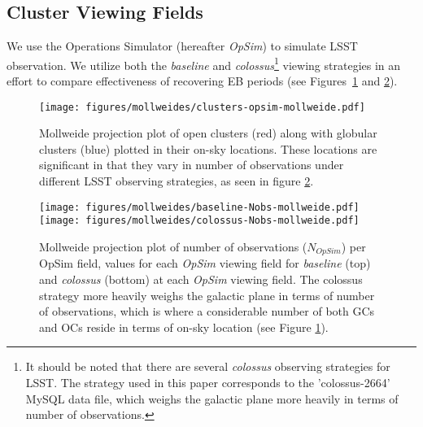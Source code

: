 \documentclass[twocolumn]{aastex63}
\begin{document}
\subsection{Cluster Viewing Fields} \label{sec:overlap}
We use the Operations Simulator (hereafter \textit{OpSim}) to simulate LSST observation. We utilize both the \textit{baseline} and \textit{colossus}\footnote{It should be noted that there are several \textit{colossus} observing strategies for LSST. The strategy used in this paper corresponds to the 'colossus-2664' MySQL data file, which weighs the galactic plane more heavily in terms of number of observations.} viewing strategies in an effort to compare effectiveness of recovering EB periods (see Figures~\ref{fig:cluster_mollweide} and \ref{fig:baseline_mollweide}). 

\begin{figure}
    \centering
    \texttt{[image: figures/mollweides/clusters-opsim-mollweide.pdf]}
    \caption{Mollweide projection plot of open clusters (red) along with globular clusters (blue) plotted in their on-sky locations. These locations are significant in that they vary in number of observations under different LSST observing strategies, as seen in figure \ref{fig:baseline_mollweide}.}
    \label{fig:cluster_mollweide}
\end{figure}

\begin{figure}
    \centering
        \texttt{[image: figures/mollweides/baseline-Nobs-mollweide.pdf]}
        \texttt{[image: figures/mollweides/colossus-Nobs-mollweide.pdf]}
        
        \caption{Mollweide projection plot of number of observations ($N_{\textit{OpSim}}$) per OpSim field,  values for each \textit{OpSim} viewing field for \textit{baseline} (top) and \textit{colossus} (bottom) at each \textit{OpSim} viewing field. The colossus strategy more heavily weighs the galactic plane in terms of number of observations, which is where a considerable number of both GCs and OCs reside in terms of on-sky location (see Figure \ref{fig:cluster_mollweide}).}
        \label{fig:colossus_mollweide}
        \label{fig:baseline_mollweide}

\end{figure}
\end{document}
